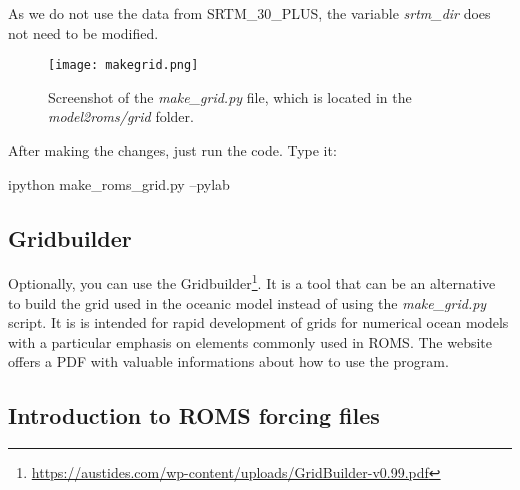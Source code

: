 \begin{tcolorbox}[enhanced,
    grow to left by   = 0cm,
    grow to right by  = 0cm,
    enlarge top by    = 0cm,
    enlarge bottom by = 0cm,
    tcbox raise base,
    boxrule           = 1.0pt,
    left              = 18mm,
    colframe          = yellow!50!black,coltext=yellow!25!black,colback=yellow!10!white,
    overlay           = {\begin{tcbclipinterior}\fill[yellow!75!blue!50!white] (frame.south west)
      rectangle node[text=white,font=\sffamily\bfseries\footnotesize,rotate=0] {ATTENTION} ([xshift=18mm]frame.north west);\end{tcbclipinterior}}]
As we do not use the data from SRTM\_30\_PLUS, the variable \textit{srtm\_dir} does not need to be modified.
\end{tcolorbox}
\bigskip

\begin{figure}[H]
    \centering
    \texttt{[image: makegrid.png]}
    \caption{Screenshot of the \textit{make\_grid.py} file, which is located in the \textit{model2roms/grid} folder.}
    \label{fazgrade}
\end{figure}
\bigskip

After making the changes, just run the code. Type it:
\bigskip

\begin{bashcode}
ipython make_roms_grid.py --pylab
\end{bashcode}
\bigskip

\subsection{Gridbuilder}
\bigskip

Optionally, you can use the Gridbuilder\textcolor{bleu_cite}{\textit{}\footnote{\textcolor{bleu_cite}{\href{https://austides.com/wp-content/uploads/GridBuilder-v0.99.pdf}{https://austides.com/wp-content/uploads/GridBuilder-v0.99.pdf}}}}.
It is a tool that can be an alternative to build the grid used in the oceanic model instead of using the \textit{make\_grid.py} script. It is is intended for rapid development of grids for numerical ocean models
with a particular emphasis on elements commonly used in ROMS. The website offers a PDF with valuable informations about how to use the program.

\subsection{Introduction to ROMS forcing files}
\bigskip

